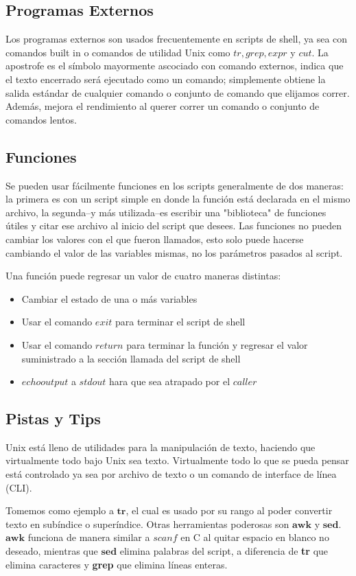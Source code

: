 \documentclass{article}
\begin{document}
\subsection{Programas Externos}
Los programas externos son usados frecuentemente en scripts de shell, ya sea con comandos built in o comandos de utilidad Unix como $tr, grep, expr$ y $cut$. La apostrofe es el símbolo mayormente ascociado con comando externos, indica que el texto encerrado será ejecutado como un comando; simplemente obtiene la salida estándar de cualquier comando o conjunto de comando que elijamos correr. Además, mejora el rendimiento al querer correr un comando o conjunto de comandos lentos.

\subsection{Funciones}
Se pueden usar fácilmente funciones en los scripts generalmente de dos maneras: la primera es con un script simple en donde la función está declarada en el mismo archivo, la segunda--y más utilizada--es escribir una "biblioteca" de funciones útiles y citar ese archivo al inicio del script que desees. Las funciones no pueden cambiar los valores con el que fueron llamados, esto solo puede hacerse cambiando el valor de las variables mismas, no los parámetros pasados al script.

Una función puede regresar un valor de cuatro maneras distintas:
\begin{itemize}
\item Cambiar el estado de una o más variables
\item Usar el comando $exit$ para terminar el script de shell
\item Usar el comando $return$ para terminar la función y regresar el valor suministrado a la sección llamada del script de shell
\item $echo output$ a $stdout$ hara que sea atrapado por el $caller$
\end{itemize}

\subsection{Pistas y Tips}
Unix está lleno de utilidades para la manipulación de texto, haciendo que virtualmente todo bajo Unix sea texto. Virtualmente todo lo que se pueda pensar está controlado ya sea por archivo de texto o un comando de interface de línea (CLI).

Tomemos como ejemplo a $\textbf{tr}$, el cual es usado por su rango al poder convertir texto en subíndice o superíndice. Otras herramientas poderosas son $\textbf{awk}$ y $\textbf{sed}$. $\textbf{awk}$ funciona de manera similar a $scanf$ en C al quitar espacio en blanco no deseado, mientras que $\textbf{sed}$ elimina palabras del script, a diferencia de \textbf{tr} que elimina caracteres y \textbf{grep} que elimina líneas enteras.
\end{document}
